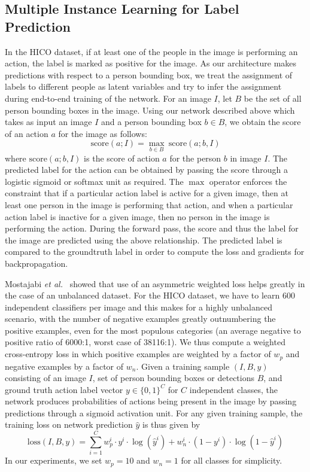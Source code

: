 \documentclass[runningheads]{llncs}
\begin{document}
\subsection{Multiple Instance Learning for Label Prediction}\label{subsec:MIL}
In the HICO dataset, if at least one of the people in the image is performing an action, the label is marked as positive for the image. As our architecture makes predictions with respect to a person bounding box, we treat the assignment of labels to different people as latent variables and try to infer the assignment during end-to-end training of the network. For an image $I$, let $B$ be the set of all person bounding boxes in the image. Using our network described above which takes as input an image $I$ and a person bounding box $b\in B$, we obtain the score of an action $a$ for the image as follows:
\begin{equation}
    \text{score}(a; I) = \max_{b\in B} \ \text{score}(a; b, I)
\end{equation}
where $\text{score}(a; b, I)$ is the score of action $a$ for the person $b$ in image $I$. The predicted label for the action can be obtained by passing the score through a logistic sigmoid or softmax unit as required. The $\max$ operator enforces the constraint that if a particular action label is active for a given image, then at least one person in the image is performing that action, and when a particular action label is inactive for a given image, then no person in the image is performing the action. During the forward pass, the score and thus the label for the image are predicted using the above relationship. The predicted label is compared to the groundtruth label in order to compute the loss and gradients for backpropagation.

Mostajabi \emph{et al.}~\cite{mostajabi2015feedforward} showed that use of an asymmetric weighted loss helps greatly in the case of an unbalanced dataset. For the HICO dataset, we have to learn 600 independent classifiers per image and this makes for a highly unbalanced scenario, with the number of negative examples greatly outnumbering the positive examples, even for the most populous categories (an average negative to positive ratio of 6000:1, worst case of 38116:1). We thus compute a weighted cross-entropy loss in which positive examples are weighted by a factor of $w_p$ and negative examples by a factor of $w_n$. Given a training sample $(I, B, y)$ consisting of an image $I$, set of person bounding boxes or detections $B$, and ground truth action label vector $y\in\{0,1\}^C$ for $C$ independent classes, the network produces probabilities of actions being present in the image by passing predictions through a sigmoid activation unit. For any given training sample, the training loss on network prediction $\hat{y}$ is thus given by
\begin{equation}
	\text{loss}(I, B, y) = \sum_{i=1}^{C}  w_p^i \cdot y^i \cdot \log(\hat{y}^i) + w_n^i \cdot (1-y^i) \cdot \log(1-\hat{y}^i)
\end{equation}
In our experiments, we set $w_p=10$ and $w_n=1$ for all classes for simplicity.
\end{document}
